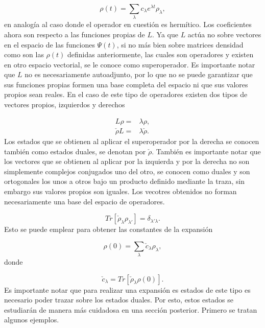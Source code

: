 \documentclass[a4paper,10pt]{report}
\begin{document}
\begin{equation}
\rho(t) = \sum_{\lambda} c_{\lambda} e^{\lambda t}\rho_{\lambda} ,
\end{equation}en analogía al caso donde el operador en cuestión es hermítico. Los coeficientes ahora son respecto a las funciones propias de $L$. Ya que $L$ actúa no sobre vectores en el espacio de las funciones $\Psi(t)$, si no más bien sobre matrices densidad como son las $\rho(t)$ definidas anteriormente, las cuales son operadores y existen en otro espacio vectorial, se le conoce como superoperador. Es importante notar que $L$ no es necesariamente autoadjunto, por lo que no se puede garantizar que sus funciones propias formen una base completa del espacio ni que sus valores propios sean reales. En el caso de este tipo de operadores existen dos tipos de vectores propios\cite{BarnettSD}, izquierdos y derechos

\begin{align*}
L\rho =& \lambda \rho, \\
\check{\rho} L =& \lambda \check{\rho}.
\end{align*} Los estados que se obtienen al aplicar el superoperador por la derecha se conocen también como estados duales, se denotan por $\check{\rho}$. También es importante notar que los vectores que se obtienen al aplicar por la izquierda y por la derecha no son simplemente complejos conjugados uno del otro, se conocen como duales y son ortogonales los unos a otros bajo un producto definido mediante la traza\cite{EnglertDB}, sin embargo sus valores propios son iguales. Los vecotres obtenidos no forman necesariamente una base del espacio de operadores. 

\begin{equation}
Tr[\check{\rho}_\lambda \rho_{\lambda'}] = \delta_{\lambda'\lambda}.
\end{equation} Esto se puede emplear para obtener las constantes de la expansión

\begin{equation}
\rho(0) = \sum_{\lambda} \check{c}_{\lambda} \rho_{\lambda},
\end{equation} donde

\begin{equation}
\check{c}_\lambda = Tr[\check{\rho}_\lambda \rho(0)].
\end{equation} Es importante notar que para realizar una expansión es estados de este tipo es necesario poder trazar sobre los estados duales. Por esto, estos estados se estudiarán de manera más cuidadosa en una sección posterior. Primero se tratan algunos ejemplos.
\end{document}
